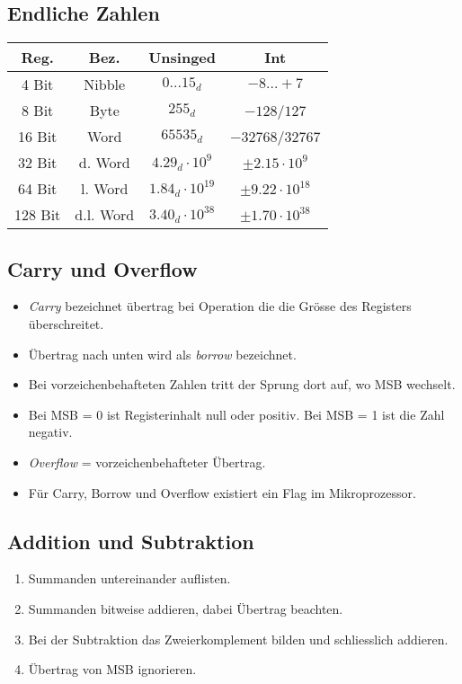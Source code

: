 \subsection{Endliche Zahlen}
\begin{tabular}{| c | c | c | c |}
	\hline
	Reg. & Bez. & Unsinged & Int \\
	\hline
	\hline
	4 Bit & Nibble & $0 ... 15_d$ & $-8 ... +7$ \\
	\hline
	8 Bit & Byte & $255_d$ & $-128$/$127$ \\
	\hline
	16 Bit & Word & $65535_d$ & $-32768$/$32767$ \\
	\hline
	32 Bit & d. Word & $4.29_d \cdot 10^9$ & $\pm 2.15 \cdot 10^9$ \\
	\hline
	64 Bit & l. Word & $1.84_d \cdot 10^{19}$ & $\pm 9.22 \cdot 10^{18}$ \\
	\hline
	128 Bit & d.l. Word & $3.40_d \cdot 10^{38}$ & $\pm 1.70 \cdot 10^{38}$ \\
	\hline
\end{tabular}

\subsection{Carry und Overflow}
\begin{itemize}
	\item \textit{Carry} bezeichnet übertrag bei Operation die die Grösse des Registers überschreitet.
	\item Übertrag nach unten wird als \textit{borrow} bezeichnet.
	\item Bei vorzeichenbehafteten Zahlen tritt der Sprung dort auf, wo MSB wechselt.
	\item Bei MSB = 0 ist Registerinhalt null oder positiv. Bei MSB = 1 ist die Zahl negativ.
	\item \textit{Overflow} = vorzeichenbehafteter Übertrag.
	\item Für Carry, Borrow und Overflow existiert ein Flag im Mikroprozessor.
\end{itemize}

\subsection{Addition und Subtraktion}
\begin{enumerate}
	\item Summanden untereinander auflisten.
	\item Summanden bitweise addieren, dabei Übertrag beachten.
	\item Bei der Subtraktion das Zweierkomplement bilden und schliesslich addieren.
	\item Übertrag von MSB ignorieren.
\end{enumerate}

